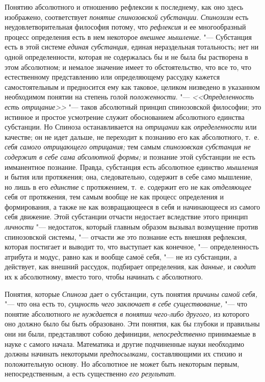 Понятию абсолютного и отношению рефлексии к последнему, как оно здесь
изображено, соответствует {\em понятие спинозовской
субстанции}. {\em Спинозизм} есть неудовлетворительная
философия потому, что {\em рефлексия} и ее
многообразный процесс определения есть в нем некоторое
{\em внешнее мышление}. "--- Субстанция есть в этой
системе {\em единая субстанция,} единая нераздельная
тотальность; нет ни одной определенности, которая не содержалась бы и не
была бы растворена в этом абсолютном; и немалое значение имеет то
обстоятельство, что все то, что естественному представлению или
определяющему рассудку кажется самостоятельным и предносится ему как
таковое, целиком низведено в указанном необходимом понятии на степень голой
{\em положенности}. "--- {\em <<Определенность есть отрицание>>} "--- таков
абсолютный принцип спинозовской
философии;
это истинное и простое усмотрение служит обоснованием абсолютного единства
субстанции. Но Спиноза останавливается на {\em отрицании} как
{\em определенности} или качестве; он не идет дальше,
не переходит к познанию его как абсолютного, т.~е.
{\em себя самого отрицающего отрицания;} тем самым
{\em спинозовская субстанция не содержит в себе сама
абсолютной формы;} и познание этой субстанции не есть имманентное познание.
Правда, субстанция есть абсолютное единство
{\em мышления} и бытия или протяжения; она,
следовательно, содержит в себе само мышление, но лишь в его
{\em единстве} с протяжением, т.~е. содержит его не как
{\em отделяющее} себя от протяжения, тем самым вообще
не как процесс определения и формирования, а также не как возвращающееся в
себя и начинающееся из самого себя движение. Этой субстанции отчасти
недостает вследствие этого принцип {\em личности}
"--- недостаток, который главным образом вызывал возмущение против
спинозовской системы, "--- отчасти же это познание есть внешняя рефлексия,
которая постигает и выводит то, что выступает как конечное, "---
определенность атрибута и модус, равно как и вообще самоё себя, "--- не из
субстанции, а действует, как внешний рассудок, подбирает определения, как
{\em данные,} и {\em сводит} их к
абсолютному, вместо того, чтобы начинать с абсолютного.

Понятия, которые {\em Спиноза} дает о субстанции, суть
понятия {\em причины самой себя,} "--- что она есть то,
{\em сущность чего заключает в себе существование,} "---
что понятие абсолютного {\em не нуждается в понятии
чего-либо другого,} из которого оно должно было бы быть образовано. Эти
понятия, как бы глубоки и правильны они ни были, представляют собою
дефиниции, {\em непосредственно} принимаемые в науке с
самого начала. Математика и другие подчиненные науки необходимо должны
начинать некоторыми {\em предпосылками,} составляющими
их стихию и положительную основу. Но абсолютное не может быть некоторым
первым, непосредственным, а есть существенно {\em его
результат}.


